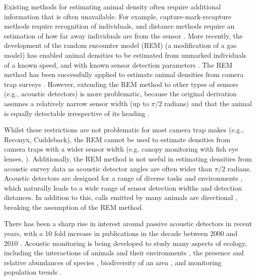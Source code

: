 \documentclass[a4paper,10pt,reqno,oneside]{amsart}
\begin{document}
Existing methods for estimating animal density often require additional information that is often unavailable. For example, capture-mark-recapture methods \citep{karanth1995estimating, trolle2007camera, borchers2014continuous} require recognition of individuals, and distance methods \citep{harris2013applying} require an estimation of how far away individuals are from the sensor \citep{barlow2005estimates, marques2011estimating}. More recently, the development of the random encounter model (REM) (a modification of a gas model) has enabled animal densities to be estimated from unmarked individuals of a known speed, and with known sensor detection parameters \citep{rowcliffe2008estimating}. The REM method has been successfully applied to estimate animal densities from camera trap surveys \citep{manzo2012estimation, zero2013monitoring}. However, extending the REM method to other types of sensors (e.g., acoustic detectors) is more problematic, because the original derivation assumes a relatively narrow sensor width (up to $\pi/2$ radians) and that the animal is equally detectable irrespective of its heading \citep{rowcliffe2008estimating}. 

Whilst these restrictions are not problematic for most camera trap makes (e.g., Reconyx, Cuddeback), the REM cannot be used to estimate densities from camera traps with a wider sensor width (e.g. canopy monitoring with fish eye lenses, \citet{brusa2014increasing}). Additionally, the REM method is not useful in estimating densities from acoustic survey data as acoustic detector angles are often wider than $\pi/2$ radians.  Acoustic detectors are designed for a range of diverse tasks and environments \citep{kessel2014review}, which naturally leads to a wide range of sensor detection widths and detection distances. In addition to this, calls emitted by many animals are directional \citep{blumstein2011acoustic}, breaking the assumption of the REM method. 

There has been a sharp rise in interest around passive acoustic detectors in recent years, with a 10 fold increase in publications in the decade between 2000 and 2010 \citep{kessel2014review}. Acoustic monitoring is being developed to study many aspects of ecology, including the interactions of animals and their environments \citep{blumstein2011acoustic, rogers2013density}, the presence and relative abundances of species \citep{marcoux2011local}, biodiversity of an area \citep{depraetere2012monitoring}, and monitoring population trends \citep{walters2013challenges}. 
\end{document}
